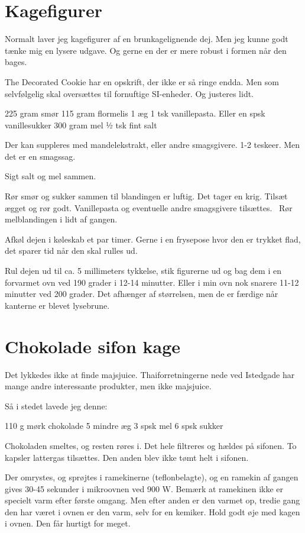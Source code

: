 \documentclass[
]{book}
\begin{document}
\section{Kagefigurer}\label{kagefigurer}

Normalt laver jeg kagefigurer af en brunkagelignende dej. Men jeg kunne godt tænke mig en lysere udgave. Og gerne en der er mere robust i formen når den bages.

The Decorated Cookie har en opskrift, der ikke er så ringe endda. Men som selvfølgelig skal oversættes til fornuftige SI-enheder. Og justeres lidt.

225 gram smør
115 gram flormelis
1 æg
1 tsk vanillepasta. Eller en spsk vanillesukker
300 gram mel
½ tsk fint salt

Der kan suppleres med mandelekstrakt, eller andre smagsgivere. 1-2 teskeer. Men det er en smagssag.

Sigt salt og mel sammen.

Rør smør og sukker sammen til blandingen er luftig. Det tager en krig. Tilsæt ægget og rør godt. Vanillepasta og eventuelle andre smagsgivere tilsættes.~ Rør melblandingen i lidt af gangen.

Afkøl dejen i køleskab et par timer. Gerne i en frysepose hvor den er trykket flad, det sparer tid når den skal rulles ud.

Rul dejen ud til ca. 5 millimeters tykkelse, stik figurerne ud og bag dem i en forvarmet ovn ved 190 grader i 12-14 minutter. Eller i min ovn nok snarere 11-12 minutter ved 200 grader. Det afhænger af størrelsen, men de er færdige når kanterne er blevet lysebrune.

\section{Chokolade sifon kage}\label{chokolade-sifon-kage}

Det lykkedes ikke at finde majsjuice. Thaiforretningerne nede ved Istedgade har mange andre interessante produkter, men ikke majsjuice.

Så i stedet lavede jeg denne:

110 g mørk chokolade
5 mindre æg
3 spsk mel
6 spsk sukker

Chokoladen smeltes, og resten røres i. Det hele filtreres og hældes på sifonen. To kapsler lattergas tilsættes. Den anden blev ikke tømt helt i sifonen.

Der omrystes, og sprøjtes i ramekinerne (teflonbelagte), og en ramekin af gangen gives 30-45 sekunder i mikroovnen ved 900 W. Bemærk at ramekinen ikke er specielt varm efter første omgang. Men efter anden er den varmet op, tredie gang den har været i ovnen er den varm, selv for en kemiker. Hold godt øje med kagen i ovnen. Den får hurtigt for meget.
\end{document}
